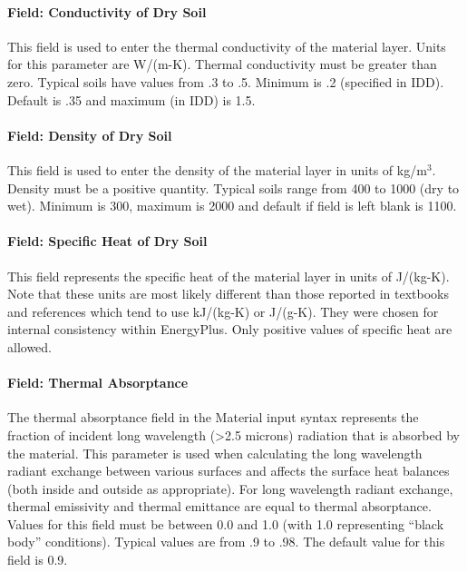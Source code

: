 \paragraph{Field: Conductivity of Dry Soil}\label{field-conductivity-of-dry-soil}

This field is used to enter the thermal conductivity of the material layer. Units for this parameter are W/(m-K). Thermal conductivity must be greater than zero. Typical soils have values from .3 to .5. Minimum is .2 (specified in IDD). Default is .35 and maximum (in IDD) is 1.5.

\paragraph{Field: Density of Dry Soil}\label{field-density-of-dry-soil}

This field is used to enter the density of the material layer in units of kg/m\(^{3}\). Density must be a positive quantity. Typical soils range from 400 to 1000 (dry to wet). Minimum is 300, maximum is 2000 and default if field is left blank is 1100.

\paragraph{Field: Specific Heat of Dry Soil}\label{field-specific-heat-of-dry-soil}

This field represents the specific heat of the material layer in units of J/(kg-K). Note that these units are most likely different than those reported in textbooks and references which tend to use kJ/(kg-K) or J/(g-K). They were chosen for internal consistency within EnergyPlus. Only positive values of specific heat are allowed.

\paragraph{Field: Thermal Absorptance}\label{field-thermal-absorptance-2}

The thermal absorptance field in the Material input syntax represents the fraction of incident long wavelength (>2.5 microns) radiation that is absorbed by the material. This parameter is used when calculating the long wavelength radiant exchange between various surfaces and affects the surface heat balances (both inside and outside as appropriate). For long wavelength radiant exchange, thermal emissivity and thermal emittance are equal to thermal absorptance. Values for this field must be between 0.0 and 1.0 (with 1.0 representing ``black body'' conditions). Typical values are from .9 to .98. The default value for this field is 0.9.

